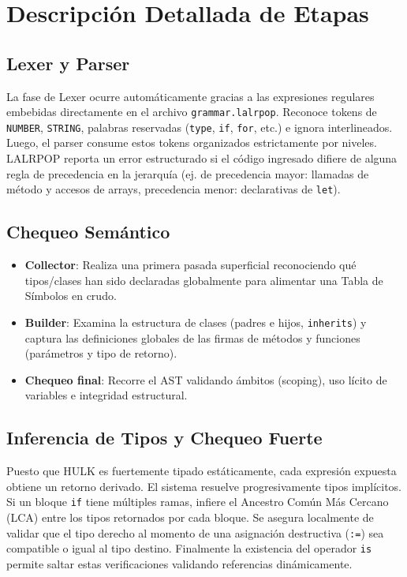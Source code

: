 \documentclass[11pt,a4paper]{article}
\begin{document}
\newpage
\section{Descripción Detallada de Etapas}

\subsection{Lexer y Parser}
La fase de Lexer ocurre automáticamente gracias a las expresiones regulares embebidas directamente en el archivo \texttt{grammar.lalrpop}. Reconoce tokens de \texttt{NUMBER}, \texttt{STRING}, palabras reservadas (\texttt{type}, \texttt{if}, \texttt{for}, etc.) e ignora interlineados. Luego, el parser consume estos tokens organizados estrictamente por niveles. LALRPOP reporta un error estructurado si el código ingresado difiere de alguna regla de precedencia en la jerarquía (ej. de precedencia mayor: llamadas de método y accesos de arrays, precedencia menor: declarativas de \texttt{let}).

\subsection{Chequeo Semántico}
\begin{itemize}
    \item \textbf{Collector}: Realiza una primera pasada superficial reconociendo qué tipos/clases han sido declaradas globalmente para alimentar una Tabla de Símbolos en crudo.
    \item \textbf{Builder}: Examina la estructura de clases (padres e hijos, \texttt{inherits}) y captura las definiciones globales de las firmas de métodos y funciones (parámetros y tipo de retorno).
    \item \textbf{Chequeo final}: Recorre el AST validando ámbitos (scoping), uso lícito de variables e integridad estructural. 
\end{itemize}

\subsection{Inferencia de Tipos y Chequeo Fuerte}
Puesto que HULK es fuertemente tipado estáticamente, cada expresión expuesta obtiene un retorno derivado. 
El sistema resuelve progresivamente tipos implícitos. Si un bloque \texttt{if} tiene múltiples ramas, infiere el Ancestro Común Más Cercano (LCA) entre los tipos retornados por cada bloque. Se asegura localmente de validar que el tipo derecho al momento de una asignación destructiva (\texttt{:=}) sea compatible o igual al tipo destino. Finalmente la existencia del operador \texttt{is} permite saltar estas verificaciones validando referencias dinámicamente.
\end{document}
